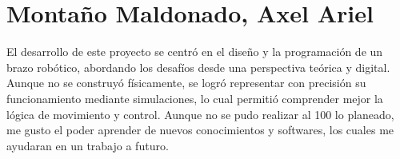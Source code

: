 \section{Montaño Maldonado, Axel Ariel}

El desarrollo de este proyecto se centró en el diseño y la programación de un brazo robótico, abordando los desafíos desde una perspectiva teórica y digital. Aunque no se construyó físicamente, se logró representar con precisión su funcionamiento mediante simulaciones, lo cual permitió comprender mejor la lógica de movimiento y control. Aunque no se pudo realizar al 100 lo planeado, me gusto el poder aprender de nuevos conocimientos y softwares, los cuales me ayudaran en un trabajo a futuro.
